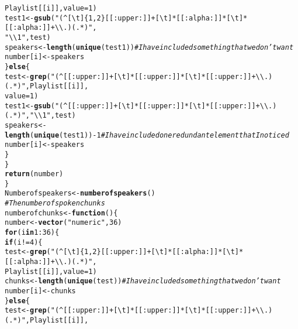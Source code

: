 \documentclass{article}\usepackage[]{graphicx}\usepackage[]{color}
\makeatletter
\newcommand{\hlnum}[1]{\textcolor[rgb]{0.686,0.059,0.569}{#1}}%
\newcommand{\hlstr}[1]{\textcolor[rgb]{0.192,0.494,0.8}{#1}}%
\newcommand{\hlcom}[1]{\textcolor[rgb]{0.678,0.584,0.686}{\textit{#1}}}%
\newcommand{\hlopt}[1]{\textcolor[rgb]{0,0,0}{#1}}%
\newcommand{\hlstd}[1]{\textcolor[rgb]{0.345,0.345,0.345}{#1}}%
\newcommand{\hlkwa}[1]{\textcolor[rgb]{0.161,0.373,0.58}{\textbf{#1}}}%
\newcommand{\hlkwb}[1]{\textcolor[rgb]{0.69,0.353,0.396}{#1}}%
\newcommand{\hlkwc}[1]{\textcolor[rgb]{0.333,0.667,0.333}{#1}}%
\newcommand{\hlkwd}[1]{\textcolor[rgb]{0.737,0.353,0.396}{\textbf{#1}}}%
\newenvironment{kframe}{%
 \def\at@end@of@kframe{}%
 \ifinner\ifhmode%
  \def\at@end@of@kframe{\end{minipage}}%
  \begin{minipage}{\columnwidth}%
 \fi\fi%
 \def\FrameCommand##1{\hskip\@totalleftmargin \hskip-\fboxsep
 \colorbox{shadecolor}{##1}\hskip-\fboxsep
     \hskip-\linewidth \hskip-\@totalleftmargin \hskip\columnwidth}%
 \MakeFramed {\advance\hsize-\width
   \@totalleftmargin\z@ \linewidth\hsize
   \@setminipage}}%
 {\par\unskip\endMakeFramed%
 \at@end@of@kframe}
\newenvironment{knitrout}{}{} %
\makeatother
\begin{document}
\begin{knitrout}
\begin{kframe}
\begin{alltt}
                \hlstd{Playlist[[i]],} \hlkwc{value} \hlstd{=} \hlnum{1}\hlstd{)}
            \hlstd{test1} \hlkwb{<-} \hlkwd{gsub}\hlstd{(}\hlstr{"(^[ \textbackslash{}t]\{1,2\}[[:upper:]]+[ \textbackslash{}t]*[[:alpha:]]*[ \textbackslash{}t]*[[:alpha:]]+\textbackslash{}\textbackslash{}.)(.*)"}\hlstd{,}
                \hlstr{"\textbackslash{}\textbackslash{}1"}\hlstd{, test)}
            \hlstd{speakers} \hlkwb{<-} \hlkwd{length}\hlstd{(}\hlkwd{unique}\hlstd{(test1))}  \hlcom{#I have included something that we don't want}
            \hlstd{number[i]} \hlkwb{<-} \hlstd{speakers}
        \hlstd{\}} \hlkwa{else} \hlstd{\{}
            \hlstd{test} \hlkwb{<-} \hlkwd{grep}\hlstd{(}\hlstr{"(^[[:upper:]]+[ \textbackslash{}t]*[[:upper:]]*[ \textbackslash{}t]*[[:upper:]]+\textbackslash{}\textbackslash{}.)(.*)"}\hlstd{, Playlist[[i]],}
                \hlkwc{value} \hlstd{=} \hlnum{1}\hlstd{)}
            \hlstd{test1} \hlkwb{<-} \hlkwd{gsub}\hlstd{(}\hlstr{"(^[[:upper:]]+[ \textbackslash{}t]*[[:upper:]]*[ \textbackslash{}t]*[[:upper:]]+\textbackslash{}\textbackslash{}.)(.*)"}\hlstd{,} \hlstr{"\textbackslash{}\textbackslash{}1"}\hlstd{, test)}
            \hlstd{speakers} \hlkwb{<-} \hlkwd{length}\hlstd{(}\hlkwd{unique}\hlstd{(test1))} \hlopt{-} \hlnum{1}  \hlcom{#I have included one redundant element that I noticed}
            \hlstd{number[i]} \hlkwb{<-} \hlstd{speakers}
        \hlstd{\}}
    \hlstd{\}}
    \hlkwd{return}\hlstd{(number)}
\hlstd{\}}
\hlstd{Numberofspeakers} \hlkwb{<-} \hlkwd{numberofspeakers}\hlstd{()}
\hlcom{# The number of spoken chunks}
\hlstd{numberofchunks} \hlkwb{<-} \hlkwa{function}\hlstd{() \{}
    \hlstd{number} \hlkwb{<-} \hlkwd{vector}\hlstd{(}\hlstr{"numeric"}\hlstd{,} \hlnum{36}\hlstd{)}
    \hlkwa{for} \hlstd{(i} \hlkwa{in} \hlnum{1}\hlopt{:}\hlnum{36}\hlstd{) \{}
        \hlkwa{if} \hlstd{(i} \hlopt{!=} \hlnum{4}\hlstd{) \{}
            \hlstd{test} \hlkwb{<-} \hlkwd{grep}\hlstd{(}\hlstr{"(^[ \textbackslash{}t]\{1,2\}[[:upper:]]+[ \textbackslash{}t]*[[:alpha:]]*[ \textbackslash{}t]*[[:alpha:]]+\textbackslash{}\textbackslash{}.)(.*)"}\hlstd{,}
                \hlstd{Playlist[[i]],} \hlkwc{value} \hlstd{=} \hlnum{1}\hlstd{)}
            \hlstd{chunks} \hlkwb{<-} \hlkwd{length}\hlstd{(}\hlkwd{unique}\hlstd{(test))}  \hlcom{#I have included something that we don't want}
            \hlstd{number[i]} \hlkwb{<-} \hlstd{chunks}
        \hlstd{\}} \hlkwa{else} \hlstd{\{}
            \hlstd{test} \hlkwb{<-} \hlkwd{grep}\hlstd{(}\hlstr{"(^[[:upper:]]+[ \textbackslash{}t]*[[:upper:]]*[ \textbackslash{}t]*[[:upper:]]+\textbackslash{}\textbackslash{}.)(.*)"}\hlstd{, Playlist[[i]],}

\end{alltt}
\end{kframe}
\end{knitrout}
\end{document}
